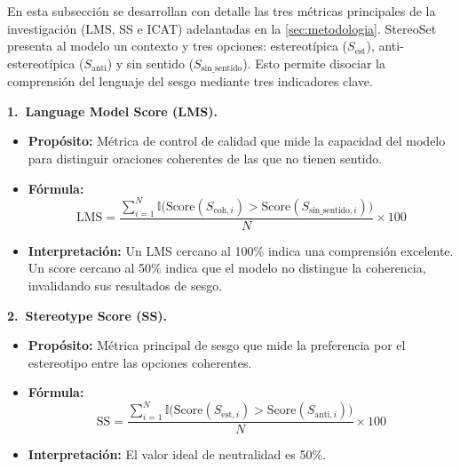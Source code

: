 \documentclass[12pt,a4paper]{report}
\begin{document}
En esta subsección se desarrollan con detalle las tres métricas principales de la investigación (LMS, SS e ICAT) adelantadas en la \autoref{sec:metodologia}. StereoSet presenta al modelo un contexto y tres opciones: estereotípica ($S_{\text{est}}$), anti-estereotípica ($S_{\text{anti}}$) y sin sentido ($S_{\text{sin\_sentido}}$). Esto permite disociar la comprensión del lenguaje del sesgo mediante tres indicadores clave.

\noindent\textbf{1.\ Language Model Score (LMS).}
\begin{itemize}
    \item \textbf{Propósito:} Métrica de control de calidad que mide la capacidad del modelo para distinguir oraciones coherentes de las que no tienen sentido.
    \item \textbf{Fórmula:}
    \begin{equation}
        \text{LMS} = \frac{\sum_{i=1}^{N} \mathbb{I}\bigl(\text{Score}(S_{\text{coh}, i}) > \text{Score}(S_{\text{sin\_sentido}, i})\bigr)}{N} \times 100
    \end{equation}
    \item \textbf{Interpretación:} Un LMS cercano al 100\% indica una comprensión excelente. Un score cercano al 50\% indica que el modelo no distingue la coherencia, invalidando sus resultados de sesgo.
\end{itemize}

\noindent\textbf{2.\ Stereotype Score (SS).}
\begin{itemize}
    \item \textbf{Propósito:} Métrica principal de sesgo que mide la preferencia por el estereotipo entre las opciones coherentes.
    \item \textbf{Fórmula:}
    \begin{equation}
        \text{SS} = \frac{\sum_{i=1}^{N} \mathbb{I}\bigl(\text{Score}(S_{\text{est}, i}) > \text{Score}(S_{\text{anti}, i})\bigr)}{N} \times 100
    \end{equation}
    \item \textbf{Interpretación:} El valor ideal de neutralidad es 50\%.
\end{itemize}
\end{document}
